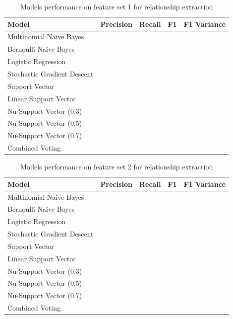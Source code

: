 \documentclass[11pt,oneside]{book}
\begin{document}
\begin{longtable}{|l|l|l|l|l|}
\caption{Models performance on feature set 1 for relationship extraction}
\label{tab:re_feature_set_1}\\
\hline
\textbf{Model}          & \multicolumn{1}{c|}{\textbf{Precision}} & \multicolumn{1}{c|}{\textbf{Recall}} & \textbf{F1} & \textbf{F1 Variance} \\ \hline
\endfirsthead
%
\endhead
%
Multinomial Naive Bayes & \multicolumn{1}{c|}{}                   & \multicolumn{1}{c|}{}                &             &                      \\ \hline
Bernoulli Naive Bayes       &  &  &  &  \\ \hline
Logistic Regression         &  &  &  &  \\ \hline
Stochastic Gradient Descent &  &  &  &  \\ \hline
Support Vector              &  &  &  &  \\ \hline
Linear Support Vector       &  &  &  &  \\ \hline
Nu-Support Vector (0.3)     &  &  &  &  \\ \hline
Nu-Support Vector (0.5)     &  &  &  &  \\ \hline
Nu-Support Vector (0.7)     &  &  &  &  \\ \hline
Combined Voting             &  &  &  &  \\ \hline
\end{longtable}

\begin{longtable}{|l|l|l|l|l|}
\caption{Models performance on feature set 2 for relationship extraction}
\label{tab:re_feature_set_2}\\
\hline
\textbf{Model}          & \multicolumn{1}{c|}{\textbf{Precision}} & \multicolumn{1}{c|}{\textbf{Recall}} & \textbf{F1} & \textbf{F1 Variance} \\ \hline
\endfirsthead
%
\endhead
%
Multinomial Naive Bayes & \multicolumn{1}{c|}{}                   & \multicolumn{1}{c|}{}                &             &                      \\ \hline
Bernoulli Naive Bayes       &  &  &  &  \\ \hline
Logistic Regression         &  &  &  &  \\ \hline
Stochastic Gradient Descent &  &  &  &  \\ \hline
Support Vector              &  &  &  &  \\ \hline
Linear Support Vector       &  &  &  &  \\ \hline
Nu-Support Vector (0.3)     &  &  &  &  \\ \hline
Nu-Support Vector (0.5)     &  &  &  &  \\ \hline
Nu-Support Vector (0.7)     &  &  &  &  \\ \hline
Combined Voting             &  &  &  &  \\ \hline
\end{longtable}
\end{document}
